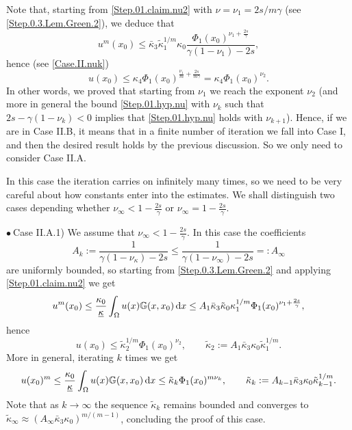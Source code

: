\documentclass[11pt]{article}
\numberwithin{equation}{section}
\newcommand{\dx}{\,{\rm d}x}
\newcommand{\kb}{\underline{\kappa}}
\renewcommand{\k}{\kappa}
\newcommand{\K}{{\mathbb G}}
\begin{document}
Note that, starting from
\eqref{Step.01.claim.nu2} with $\nu=\nu_1=2s/m\gamma$ (see \eqref{Step.0.3.Lem.Green.2}), we deduce that
 $$
 u^{m}(x_0) \le  \bar\kappa_3\tilde\kappa_1^{1/m}\kappa_0 \frac{ \Phi_1(x_0)^{\nu_1+\frac{2s}{\gamma}}}{\gamma(1-\nu_1)-2s},
 $$
 hence (see \eqref{Case.II.nuk})
 $$
 u(x_0)\leq \kappa_4\Phi_1(x_0)^{\frac{\nu_1}{m}+\frac{2s}{m\gamma}}=\kappa_4\Phi_1(x_0)^{\nu_2}.
 $$
 In other words, we proved that starting from $\nu_1$ we reach the exponent $\nu_2$ (and more in general the bound \eqref{Step.01.hyp.nu} with $\nu_k$ such that $2s-\gamma(1-\nu_k)<0$ implies that \eqref{Step.01.hyp.nu} holds with $\nu_{k+1}$).
 Hence,
if we are in Case II.B, it means that in a finite number of iteration we fall into Case I, and then the desired result holds by the previous discussion. So we only need to consider Case II.A.

In this case the iteration carries on infinitely many times, so we need to be very careful about how constants enter into the estimates.
We shall distinguish two cases depending whether $\nu_\infty<1-\frac{2s}{\gamma}$ or $\nu_\infty=1-\frac{2s}{\gamma}$.

\noindent
$\bullet~${\sc Case II.A.1)} We assume that $\nu_\infty<1-\frac{2s}{\gamma}$.
In this case the coefficients
$$
A_k:=\frac{1}{\gamma(1-\nu_\k)-2s}
\leq \frac{1}{\gamma(1-\nu_\infty)-2s}=:A_\infty
$$
are uniformly bounded, so starting from \eqref{Step.0.3.Lem.Green.2} and applying
\eqref{Step.01.claim.nu2}
we get
$$
u^m(x_0)\leq
\frac{\kappa_0}{\kb}  \int_{\Omega}  u(x)  \K(x,x_0)\dx\leq A_1\bar\kappa_3\tilde\kappa_0\kappa_1^{1/m}
\Phi_1(x_0)^{\nu_1+\frac{2s}{\gamma}},
$$
hence
$$
u(x_0)\leq \tilde \kappa_2^{1/m}\Phi_1(x_0)^{\nu_2},\qquad \tilde\kappa_2:=A_1\bar\kappa_3\kappa_0\tilde\kappa_1^{1/m}.
$$
More in general, iterating $k$ times we get
$$
u(x_0)^m\leq \frac{\kappa_0}{\kb}  \int_{\Omega}  u(x)  \K(x,x_0)\dx\leq \tilde \kappa_k\Phi_1(x_0)^{m\nu_k},\qquad \tilde \kappa_k:=A_{k-1}\bar\kappa_3\kappa_0\tilde\kappa_{k-1}^{1/m}.
$$
Note that as $k\to \infty$ the sequence $\tilde\kappa_k$ remains bounded and converges to $\tilde\kappa_\infty\approx (A_\infty\bar\kappa_3\kappa_0)^{m/(m-1)}$,
concluding the proof of this case.
\end{document}
